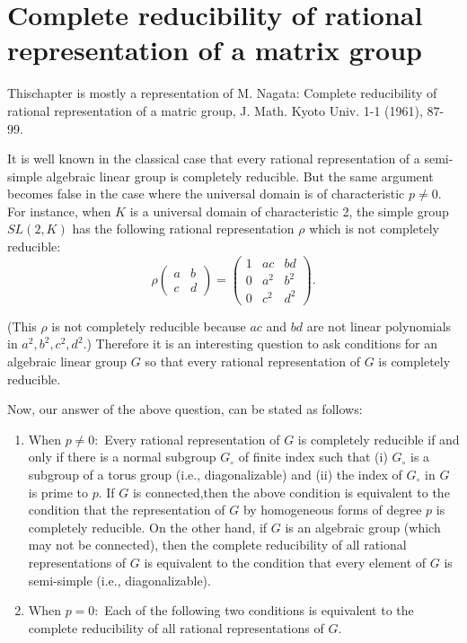 \chapter[Complete reducibility of rational representation....]{Complete reducibility of rational representation of a matrix
  group}%

This\pageoriginale chapter is mostly a representation of M. Nagata:
Complete reducibility of rational representation of a matric group,
J. Math. Kyoto Univ. 1-1 (1961), 87-99. 

It is well known in the classical case that every rational
representation of a semi-simple algebraic linear group is completely
reducible.  But the same argument becomes false in the case where the
universal domain is of characteristic $p\neq 0$.  For instance, when
$K$ is a universal domain of characteristic 2, the simple group
$SL(2, K)$ has the following rational representation $\rho$  which is
not completely reducible: 
$$
\rho 
\begin{pmatrix} 
a & b\\
c & d 
\end{pmatrix} = 
\begin{pmatrix} 
1 & ac & bd\\ 
0 & a^2 & b^2\\ 
0 & c^2 & d^2
\end{pmatrix}.
$$

(This $\rho$ is not completely reducible because $ac$ and $bd$ are not
linear polynomials in $a^2, b^2, c^2, d^2$.) Therefore it is an
interesting question to ask conditions for an algebraic linear group
$G$ so that every rational representation of $G$ is completely
reducible. 

Now, our answer of the above question, can be stated as follows: 
\begin{enumerate}
\renewcommand{\labelenumi}{\bf(\theenumi)}
\item When $p \neq 0:$ Every rational representation of $G$ is
completely reducible if and only if there is a normal subgroup
$G_{\circ}$ of finite index such that (i)  $G_{\circ}$ is a subgroup
of a torus group (i.e., diagonalizable) and (ii) the index of
$G_{\circ}$ in $G$ is prime to $p$.  If $G$ is
connected,\pageoriginale then the 
above condition is equivalent to the condition that the representation
of $G$ by homogeneous forms of degree $p$ is completely reducible.  On
the other hand, if $G$ is an algebraic group (which may not be
connected), then the complete reducibility of all rational
representations of $G$ is equivalent to the condition that every
element of $G$ is semi-simple (i.e., diagonalizable). 

\item When $p=0:$ Each of the following two conditions is equivalent to
the complete reducibility of all rational representations of $G$.   
\end{enumerate}

